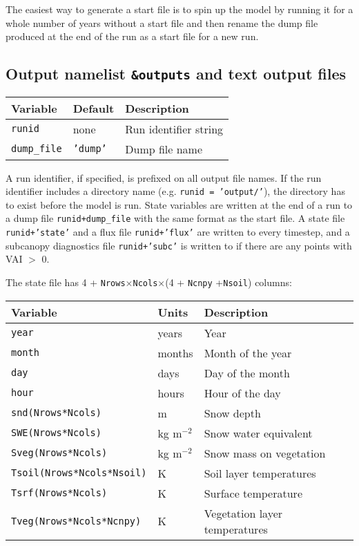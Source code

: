 \documentclass{article}
\begin{document}
The easiest way to generate a start file is to spin up the model by running it for a whole number of years without a start file and then rename the dump file produced at the end of the run as a start file for a new run.

\subsection{Output namelist {\tt \&outputs} and text output files}

\begin{longtable}{|l|l|l|}
\hline
Variable         & Default      & Description                            \\ \hline
{\tt runid}      & none         & Run identifier string                  \\
{\tt dump\_file} & {\tt 'dump'} & Dump file name                         \\ \hline 
\end{longtable}

A run identifier, if specified, is prefixed on all output file names. If the run identifier includes a directory name (e.g. {\tt runid = 'output/'}), the directory has to exist before the model is run. State variables are written at the end of a run to a dump file {\tt runid+dump\_file} with the same format as the start file. A state file {\tt runid+'state'} and a flux file {\tt runid+'flux'} are written to every timestep, and a subcanopy diagnostics file {\tt runid+'subc'} is written to if there are any points with VAI $>$ 0.

The state file has 4 + {\tt Nrows$\times$Ncols}$\times$(4 + {\tt Ncnpy} +{\tt Nsoil}) columns:
\begin{longtable}{|l|l|l|} \hline
Variable                       & Units       & Description                   \\ \hline
{\tt year}                     & years       & Year                          \\
{\tt month}                    & months      & Month of the year             \\
{\tt day}                      & days        & Day of the month              \\
{\tt hour}                     & hours       & Hour of the day               \\
{\tt snd(Nrows*Ncols)}         & m           & Snow depth                    \\
{\tt SWE(Nrows*Ncols)}         & kg m$^{-2}$ & Snow water equivalent         \\
{\tt Sveg(Nrows*Ncols)}        & kg m$^{-2}$ & Snow mass on vegetation       \\
{\tt Tsoil(Nrows*Ncols*Nsoil)} & K           & Soil layer temperatures       \\
{\tt Tsrf(Nrows*Ncols)}        & K           & Surface temperature           \\
{\tt Tveg(Nrows*Ncols*Ncnpy)}  & K           & Vegetation layer temperatures \\ \hline 
\end{longtable}
\end{document}

